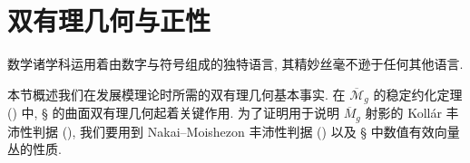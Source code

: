 \begingroup
\raggedbottom
\setlength{\emergencystretch}{2em}
\section{双有理几何与正性}\label{src:B.2}
\begin{epigraph}
数学诸学科运用着由数字与符号组成的独特语言, 其精妙丝毫不逊于任何其他语言.
\end{epigraph}
本节概述我们在发展模理论时所需的双有理几何基本事实. 在 $\overline{\mathcal M}_g$ 的稳定约化定理 () 中, \S{} 的曲面双有理几何起着关键作用. 为了证明用于说明 $\overline M_g$ 射影的 Kollár 丰沛性判据 (), 我们要用到 Nakai--Moishezon 丰沛性判据 () 以及 \S{} 中数值有效向量丛的性质.

